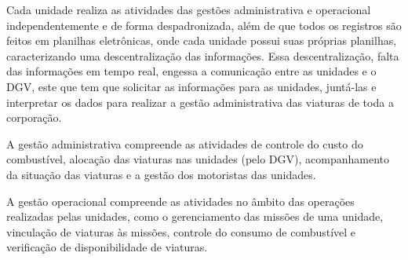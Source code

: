   Cada unidade realiza as atividades das gestões administrativa e operacional independentemente e de forma despadronizada, 
  além de que todos os registros são feitos em planilhas eletrônicas, onde cada unidade possui suas próprias planilhas, 
  caracterizando uma descentralização das informações. Essa descentralização, falta das informações em tempo real, engessa 
  a comunicação entre as unidades e o DGV, este que tem que solicitar as informações para as unidades, juntá-las e interpretar 
  os dados para realizar a gestão administrativa das viaturas de toda a corporação.
  
  A gestão administrativa compreende as atividades de controle do custo do combustível, alocação das viaturas nas unidades
  (pelo DGV), acompanhamento da situação das viaturas e a gestão dos motoristas das unidades.
  
  A gestão operacional compreende as atividades no âmbito das operações realizadas pelas unidades, como o gerenciamento das 
  missões de uma unidade, vinculação de viaturas às missões, controle do consumo de combustível e verificação de 
  disponibilidade de viaturas.
  
  \vfill
  \pagebreak